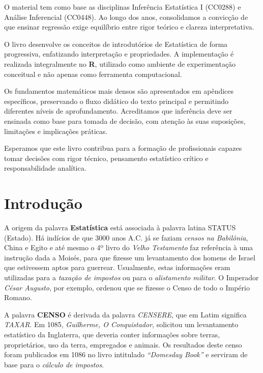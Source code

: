 \documentclass[
  letterpaper,
  DIV=11,
  numbers=noendperiod]{scrreprt}
\begin{document}
O material tem como base as disciplinas Inferência Estatística I
(CC0288) e Análise Inferencial (CC0448). Ao longo dos anos, consolidamos
a convicção de que ensinar regressão exige equilíbrio entre rigor
teórico e clareza interpretativa.

O livro desenvolve os conceitos de introdutórios de Estatística de forma
progressiva, enfatizando interpretação e propriedades. A implementação é
realizada integralmente no \textbf{R}, utilizado como ambiente de
experimentação conceitual e não apenas como ferramenta computacional.

Os fundamentos matemáticos mais densos são apresentados em apêndices
específicos, preservando o fluxo didático do texto principal e
permitindo diferentes níveis de aprofundamento. Acreditamos que
inferência deve ser ensinada como base para tomada de decisão, com
atenção às suas suposições, limitações e implicações práticas.

Esperamos que este livro contribua para a formação de profissionais
capazes tomar decisões com rigor técnico, pensamento estatístico crítico
e responsabilidade analítica.


\chapter{Introdução}\label{introduuxe7uxe3o}

A origem da palavra \textbf{Estatística} está associada à palavra latina
STATUS (Estado). Há indícios de que 3000 anos A.C. já se faziam
\emph{censos na Babilônia}, China e Egito e até mesmo o 4º livro do
\emph{Velho Testamento} faz referência à uma instrução dada a Moisés,
para que fizesse um levantamento dos homens de Israel que estivessem
aptos para guerrear. Usualmente, estas informações eram utilizadas para
a \emph{taxação de impostos} ou para o \emph{alistamento militar}. O
Imperador \emph{César Augusto}, por exemplo, ordenou que se fizesse o
Censo de todo o Império Romano.

A palavra \textbf{CENSO} é derivada da palavra \emph{CENSERE}, que em
Latim significa \emph{TAXAR}. Em 1085, \emph{Guilherme, O Conquistador},
solicitou um levantamento estatístico da Inglaterra, que deveria conter
informações sobre terras, proprietários, uso da terra, empregados e
animais. Os resultados deste censo foram publicados em 1086 no livro
intitulado \emph{``Domesday Book''} e serviram de base para o
\emph{cálculo de impostos}.
\end{document}
